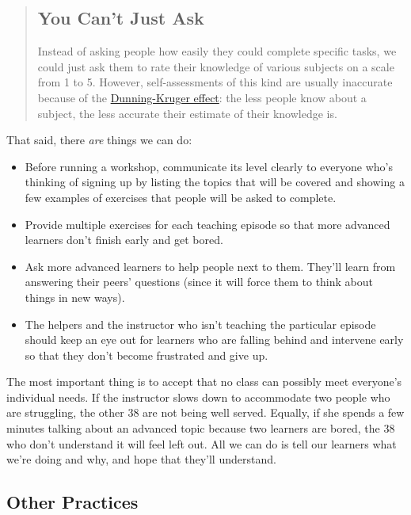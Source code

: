 \begin{quotation}   %
\subsection*{You Can't Just Ask}

Instead of asking people how easily they could complete specific tasks,
we could just ask them to rate their knowledge of various subjects
on a scale from 1 to 5.
However,
self-assessments of this kind are usually inaccurate
because of the \href{https://en.wikipedia.org/wiki/Dunning\%E2\%80\%93Kruger\_effect}{Dunning-Kruger effect}:
the less people know about a subject,
the less accurate their estimate of their knowledge is.
\end{quotation}   %

That said, there \emph{are} things we can do:

\begin{itemize}
\item Before running a workshop,
communicate its level clearly to everyone who's thinking of signing up
by listing the topics that will be covered
and showing a few examples of exercises that people will be asked to complete.
\item Provide multiple exercises for each teaching episode
so that more advanced learners don't finish early and get bored.
\item Ask more advanced learners to help people next to them.
They'll learn from answering their peers' questions
(since it will force them to think about things in new ways).
\item The helpers and the instructor who isn't teaching the particular episode
should keep an eye out for learners who are falling behind
and intervene early
so that they don't become frustrated and give up.
\end{itemize}

The most important thing is to accept that
no class can possibly meet everyone's individual needs.
If the instructor slows down to accommodate two people who are struggling,
the other 38 are not being well served.
Equally,
if she spends a few minutes talking about an advanced topic because two learners are bored,
the 38 who don't understand it will feel left out.
All we can do is tell our learners what we're doing and why,
and hope that they'll understand.

\subsection*{Other Practices}

